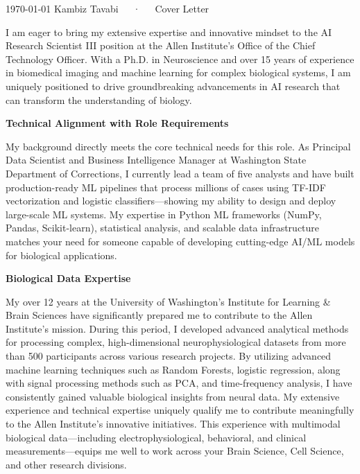 \documentclass[10.5pt, letterpaper]{russell}
\begin{document}
\makecvheader[R]

\makecvfooter
{\today}
{Kambiz Tavabi~~~·~~~Cover Letter}
{\thepage}

\makelettertitle

\begin{cvletter}
I am eager to bring my extensive expertise and innovative mindset to the AI Research Scientist III position at the Allen Institute's Office of the Chief Technology Officer. With a Ph.D. in Neuroscience and over 15 years of experience in biomedical imaging and machine learning for complex biological systems, I am uniquely positioned to drive groundbreaking advancements in AI research that can transform the understanding of biology.

\textbf{Technical Alignment with Role Requirements}

My background directly meets the core technical needs for this role. As Principal Data Scientist and Business Intelligence Manager at Washington State Department of Corrections, I currently lead a team of five analysts and have built production-ready ML pipelines that process millions of cases using TF-IDF vectorization and logistic classifiers—showing my ability to design and deploy large-scale ML systems. My expertise in Python ML frameworks (NumPy, Pandas, Scikit-learn), statistical analysis, and scalable data infrastructure matches your need for someone capable of developing cutting-edge AI/ML models for biological applications.

\textbf{Biological Data Expertise}

My over 12 years at the University of Washington's Institute for Learning \& Brain Sciences have significantly prepared me to contribute to the Allen Institute's mission. During this period, I developed advanced analytical methods for processing complex, high-dimensional neurophysiological datasets from more than 500 participants across various research projects. By utilizing advanced machine learning techniques such as Random Forests, logistic regression, along with signal processing methods such as PCA, and time-frequency analysis, I have consistently gained valuable biological insights from neural data. My extensive experience and technical expertise uniquely qualify me to contribute meaningfully to the Allen Institute's innovative initiatives. This experience with multimodal biological data—including electrophysiological, behavioral, and clinical measurements—equips me well to work across your Brain Science, Cell Science, and other research divisions.


\end{cvletter}
\end{document}
